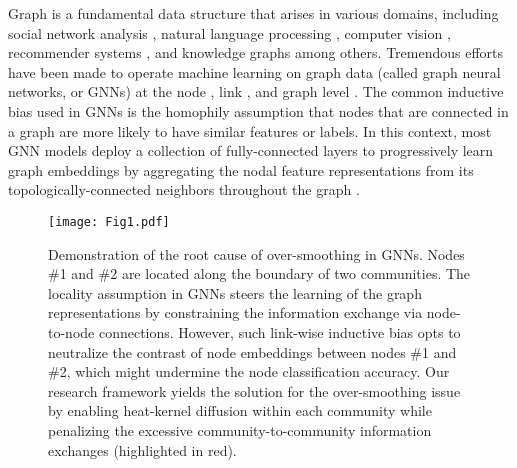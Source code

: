 \documentclass{article}
\begin{document}
Graph is a fundamental data structure that arises in various domains, including social network analysis \cite{zhang2022improving}, natural language processing \cite{wu2023graph}, computer vision \cite{pradhyumna2021graph}, recommender systems \cite{wu2022graph}, and knowledge graphs \cite{ji2021survey} among others. Tremendous efforts have been made to operate machine learning on graph data (called graph neural networks, or GNNs) at the node \cite{kipf2016semi}, link \cite{zhang2018link}, and graph level \cite{GNNBook-ch9-morris}. The common inductive bias used in GNNs is the homophily assumption that nodes that are connected in a graph are more likely to have similar features or labels. In this context, most GNN models deploy a collection of fully-connected layers to progressively learn graph embeddings  by aggregating the nodal feature representations from its topologically-connected neighbors throughout the graph \cite{hamilton2017inductive}.
\begin{figure}[h]
    \centering
    \begin{minipage}{0.35\linewidth}
        \centering
        \texttt{[image: Fig1.pdf]}
    \end{minipage}%
    \begin{minipage}{0.62\linewidth}
        \centering
        \vspace{-1.0em}
        \caption{\small Demonstration of the root cause of over-smoothing in GNNs. Nodes \#1 and \#2 are located along the boundary of two communities. The locality assumption in GNNs steers the learning of the graph representations by constraining the information exchange via node-to-node connections. However, such link-wise inductive bias opts to neutralize the contrast of node embeddings between nodes \#1 and \#2, which might undermine the node classification accuracy. Our research framework yields the solution for the over-smoothing issue by enabling heat-kernel diffusion within each community while penalizing the excessive community-to-community information exchanges (highlighted in red).}%
        \label{demo}
    \end{minipage}
    \vspace{-1.4em}
\end{figure}
\end{document}
